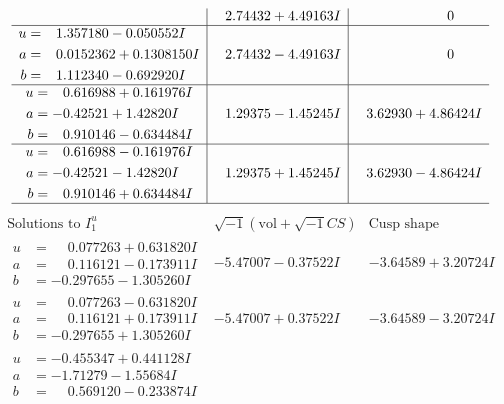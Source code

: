 \documentclass[1p]{elsarticle_modified}
\theoremstyle{definition}
\newcommand{\I}{\sqrt{-1}}
\begin{document}
$$\begin{array}{c|c|c}
 & \phantom{-}2.74432 + 4.49163 I & \phantom{-0.000000 } 0 \\ \hline\begin{aligned}
u &= \phantom{-}1.357180 - 0.050552 I \\
a &= \phantom{-}0.0152362 + 0.1308150 I \\
b &= \phantom{-}1.112340 - 0.692920 I\end{aligned}
 & \phantom{-}2.74432 - 4.49163 I & \phantom{-0.000000 } 0 \\ \hline\begin{aligned}
u &= \phantom{-}0.616988 + 0.161976 I \\
a &= -0.42521 + 1.42820 I \\
b &= \phantom{-}0.910146 - 0.634484 I\end{aligned}
 & \phantom{-}1.29375 - 1.45245 I & \phantom{-}3.62930 + 4.86424 I \\ \hline\begin{aligned}
u &= \phantom{-}0.616988 - 0.161976 I \\
a &= -0.42521 - 1.42820 I \\
b &= \phantom{-}0.910146 + 0.634484 I\end{aligned}
 & \phantom{-}1.29375 + 1.45245 I & \phantom{-}3.62930 - 4.86424 I\\
 \hline 
 \end{array}$$\newpage$$\begin{array}{c|c|c}  
\text{Solutions to }I^u_{1}& \I (\text{vol} + \sqrt{-1}CS) & \text{Cusp shape}\\
 \hline 
\begin{aligned}
u &= \phantom{-}0.077263 + 0.631820 I \\
a &= \phantom{-}0.116121 - 0.173911 I \\
b &= -0.297655 - 1.305260 I\end{aligned}
 & -5.47007 - 0.37522 I & -3.64589 + 3.20724 I \\ \hline\begin{aligned}
u &= \phantom{-}0.077263 - 0.631820 I \\
a &= \phantom{-}0.116121 + 0.173911 I \\
b &= -0.297655 + 1.305260 I\end{aligned}
 & -5.47007 + 0.37522 I & -3.64589 - 3.20724 I \\ \hline\begin{aligned}
u &= -0.455347 + 0.441128 I \\
a &= -1.71279 - 1.55684 I \\
b &= \phantom{-}0.569120 - 0.233874 I\end{aligned}

\end{array}$$
\end{document}

